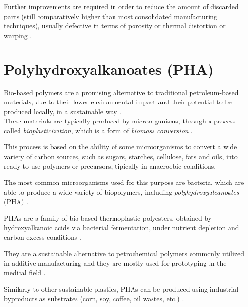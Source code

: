 \documentclass[a4paper]{article}
\begin{document}
    Further improvements are required in order to reduce the amount of discarded parts (still comparatively 
    higher than most consolidated manufacturing techniques), usually defective in terms of porosity or 
    thermal distortion or warping \autocite*{Padovano_SLS_Review}. \\ 

    
    \clearpage

    \section{Polyhydroxyalkanoates (PHA)\label{PHA_in_general}}

    Bio-based polymers are a promising alternative to traditional petroleum-based materials, due to their lower environmental impact and 
    their potential to be produced locally, in a 
    sustainable way \autocites{Biobased_foodpackaging,Kovalcik_PHA_Review,Messori_Bondioli_PHAs,PHBV_SLS_scaffolds}. \\ 

    These materials are typically produced by microorganisms, through a process called \textit{bioplasticization}, 
    which is a form of \textit{biomass conversion} \autocite*{Kovalcik_PHA_Review}. 

    This process is based on the ability of some microorganisms to convert a wide variety of carbon sources, such as sugars, 
    starches, cellulose, fats and oils, into ready to use polymers or precursors, tipically in anaeroobic conditions. 

    The most common microorganisms used for this purpose are bacteria, which are able to produce a wide variety of 
    biopolymers, including \textit{polyhydroxyalcanoates} (PHA) \autocite*{Kovalcik_PHA_Review}. 

    PHAs are a family of bio-based thermoplastic polyesters, obtained by hydroxyalkanoic acids via bacterial fermentation, under 
    nutrient depletion and carbon excess conditions \autocites{Kovalcik_PHA_Review,Messori_Bondioli_PHAs}. 

    They are a sustainable alternative to petrochemical polymers commonly utilized in 
    additive manufacturing and they are mostly used for prototyping in the medical field \autocites{Kovalcik_PHA_Review,Messori_Bondioli_PHAs}. 

    Similarly to other sustainable plastics, PHAs can be produced using industrial byproducts as substrates (corn, soy, coffee, oil wastes, etc.)
    \autocite{Kovalcik_PHA_Review}. \\ 
\end{document}
